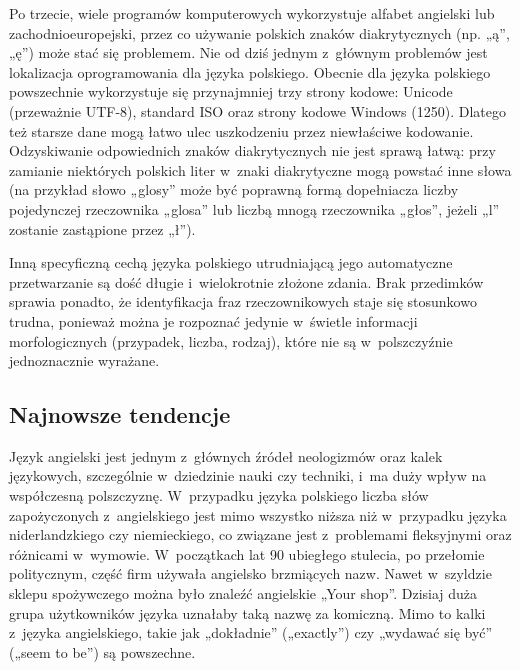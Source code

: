 \begin{multicols}{2}

Po trzecie, wiele programów komputerowych wykorzystuje alfabet
angielski lub zachodnioeuropejski, przez co używanie polskich znaków
diakrytycznych (np. „ą”, „ę”) może stać się problemem.
Nie od dziś jednym z~głównym problemów jest lokalizacja
oprogramowania dla języka polskiego. Obecnie dla języka polskiego
powszechnie wykorzystuje się przynajmniej trzy strony kodowe: Unicode
(przeważnie UTF-8), standard ISO oraz strony kodowe Windows (1250).
Dlatego też starsze dane mogą łatwo ulec uszkodzeniu przez
niewłaściwe kodowanie. Odzyskiwanie odpowiednich znaków
diakrytycznych nie jest sprawą łatwą: przy zamianie niektórych
polskich liter w~znaki diakrytyczne mogą powstać inne słowa (na
przykład słowo „glosy” może być poprawną formą dopełniacza
liczby pojedynczej rzeczownika „glosa” lub liczbą mnogą
rzeczownika „głos”, jeżeli „l” zostanie zastąpione przez
„ł”). 

Inną specyficzną cechą języka polskiego utrudniającą jego
automatyczne przetwarzanie są dość długie i~wielokrotnie złożone
zdania. Brak przedimków sprawia ponadto, że identyfikacja fraz
rzeczownikowych staje się stosunkowo trudna, ponieważ można je
rozpoznać jedynie w~świetle informacji morfologicznych (przypadek,
liczba, rodzaj), które nie są w~polszczyźnie jednoznacznie
wyrażane. 

\subsection[Najnowsze tendencje]{Najnowsze tendencje} Język angielski
jest jednym z~głównych źródeł neologizmów oraz kalek
językowych, szczególnie w~dziedzinie nauki czy techniki, i~ma duży
wpływ na współczesną polszczyznę. W~przypadku języka polskiego
liczba słów zapożyczonych z~angielskiego jest mimo wszystko niższa
niż w~przypadku języka niderlandzkiego czy niemieckiego, co
związane jest z~problemami fleksyjnymi oraz różnicami w~wymowie.
W~początkach lat 90 ubiegłego stulecia, po przełomie politycznym,
część firm używała angielsko brzmiących nazw. Nawet w~szyldzie
sklepu spożywczego można było znaleźć angielskie „Your shop”.
Dzisiaj duża grupa użytkowników języka uznałaby taką nazwę za
komiczną. Mimo to kalki z~języka angielskiego, takie jak
„dokładnie” („exactly”) czy „wydawać się być” („seem
to be”) są powszechne. 



\end{multicols}
